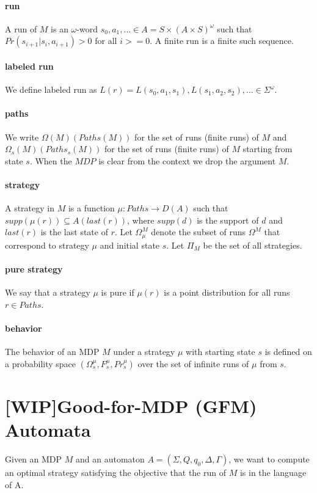 \documentclass{fithesis3}
\begin{document}
		\paragraph{run}
		A run of $M$ is an $\omega$-word 
		$s_0,a_1,...\in A=S \times (A \times S)^\omega$
		such that $Pr(s_{i+1}|s_i, a_{i+1})>0$ for all $i >= 0$. A finite run is a finite such sequence.
		\paragraph{labeled run}
		We define labeled run as
		$L(r)=L(s_0,a_1,s_1), L(s_1, a_2, s_2),... \in \Sigma^\omega$.
		\paragraph{paths}
		We write $\Omega(M)(Paths(M))$
		for the set of runs (finite runs) of $M$ and
		$\Omega_s(M)(Paths_s(M))$ for the set of runs (finite runs)
		of $M$ starting from state $s$. When the $MDP$ is clear from the context we drop the argument $M$.
		\paragraph{strategy}
		A strategy in $M$ is a
		function $\mu:Paths \rightarrow D(A)$
		such that $supp(\mu(r))\subseteq A(last(r))$,
		where $supp(d)$ is the support of $d$ and
		$last(r)$ is the last state of $r$.
		Let $\Omega^M_\mu$ denote the subset of runs $\Omega^M$
		that correspond to strategy $\mu$ and initial state $s$.
		Let $\Pi_M$ be the set of all strategies.
		\paragraph{pure strategy}
		We say that a strategy $\mu$ is pure
		if $\mu(r)$ is a point distribution for all runs $r \in Paths$.
		\paragraph{behavior}
		The behavior of an MDP $M$
		under a strategy $\mu$ with starting state $s$ is defined
		on a probability space $(\Omega_s^\mu, F_s^\mu, Pr_s^\mu)$
		over the set of infinite runs of $\mu$ from $s$.
		
		\section{[WIP]Good-for-MDP (GFM) Automata}
		Given an MDP $M$ and an
		automaton $A=(\Sigma, Q, q_0, \Delta, \Gamma)$, we want to compute an optimal strategy satisfying the objective that the run of $M$
		is in the language of A.
\end{document}
